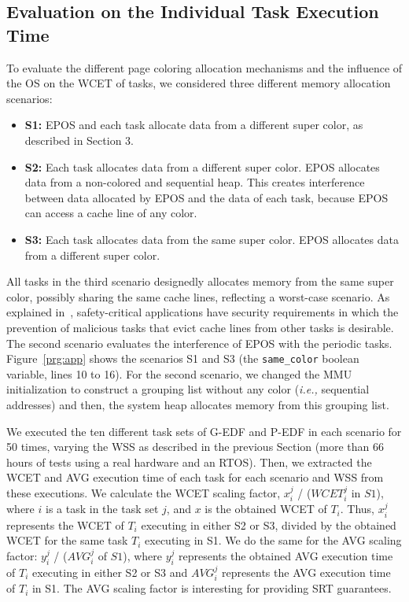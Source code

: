 \documentclass[10pt, conference, compsocconf]{IEEEtran}
\begin{document}
\subsection{Evaluation on the Individual Task Execution Time}

To evaluate the different page coloring allocation mechanisms and the influence of the OS on the WCET of tasks, we considered three different memory allocation scenarios:

\begin{itemize}
	\item \textbf{S1:} EPOS and each task allocate data from a different super color, as described in Section 3.
	\item \textbf{S2:} Each task allocates data from a different super color. EPOS allocates data from a non-colored and sequential heap. This creates interference between data allocated by EPOS and the data of each task, because EPOS can access a cache line of any color.
	\item \textbf{S3:} Each task allocates data from the same super color. EPOS allocates data from a different super color.
\end{itemize}

All tasks in the third scenario designedly allocates memory from the same super color, possibly sharing the same cache lines, reflecting a worst-case scenario. As explained in~\cite{Kenna:2013}, safety-critical applications have security requirements in which the prevention of malicious tasks that evict cache lines from other tasks is desirable. The second scenario evaluates the interference of EPOS with the periodic tasks. Figure~\ref{prg:app} shows the scenarios S1 and S3 (the \texttt{same\_color} boolean variable, lines 10 to 16). For the second scenario, we changed the MMU initialization to construct a grouping list without any color (\textit{i.e.,} sequential addresses) and then, the system heap allocates memory from this grouping list.

We executed the ten different task sets of G-EDF and P-EDF in each scenario for 50 times, varying the WSS as described in the previous Section (more than 66 hours of tests using a real hardware and an RTOS). Then, we extracted the WCET and AVG execution time of each task for each scenario and WSS from these executions. We calculate the WCET scaling factor, $x_i^j$ / ($WCET_i^j$ in $S1$), where $i$ is a task in the task set $j$, and $x$ is the obtained WCET of $T_i$. Thus, $x_i^j$ represents the WCET of $T_i$ executing in either S2 or S3, divided by the obtained WCET for the same task $T_i$ executing in S1. We do the same for the AVG scaling factor: $y_i^j$ / ($AVG_i^j$ of $S1$), where $y_i^j$ represents the obtained AVG execution time of $T_i$ executing in either S2 or S3 and $AVG_i^j$ represents the AVG execution time of $T_i$ in S1. The AVG scaling factor is interesting for providing SRT guarantees. 
\end{document}
